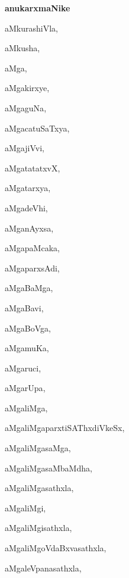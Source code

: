 \begin{center}
{\huge\bfseries anukarxmaNike}
\end{center}

\medskip

\begin{multicols}{2}

{aMkurashiVla}, \pageref{aMkurashiVla}

{aMkusha}, \pageref{aMkusha}

{aMga}, \pageref{aMga}

{aMgakirxye}, \pageref{aMgakirxye}

{aMgaguNa}, \pageref{aMgaguNa}

{aMgacatuSaTxya}, \pageref{aMgacatuSaTxya}

{aMgajiVvi}, \pageref{aMgajiVvi}

{aMgatatatxvX}, \pageref{aMgatatatxvX}

{aMgatarxya}, \pageref{aMgatarxya}

{aMgadeVhi}, \pageref{aMgadeVhi}

{aMganAyxsa}, \pageref{aMganAyxsa}

{aMgapaMcaka}, \pageref{aMgapaMcaka}

{aMgaparxsAdi}, \pageref{aMgaparxsAdi}

{aMgaBaMga}, \pageref{aMgaBaMga}

{aMgaBavi}, \pageref{aMgaBavi}

{aMgaBoVga}, \pageref{aMgaBoVga}

{aMgamuKa}, \pageref{aMgamuKa}

{aMgaruci}, \pageref{aMgaruci}

{aMgarUpa}, \pageref{aMgarUpa}

{aMgaliMga}, \pageref{aMgaliMga}

{aMgaliMgaparxtiSAThxdiVkeSx}, \pageref{aMgaliMgaparxtiSAThxdiVkeSx}

{aMgaliMgasaMga}, \pageref{aMgaliMgasaMga}

{aMgaliMgasaMbaMdha}, \pageref{aMgaliMgasaMbaMdha}

{aMgaliMgasathxla}, \pageref{aMgaliMgasathxla}

{aMgaliMgi}, \pageref{aMgaliMgi}

{aMgaliMgisathxla}, \pageref{aMgaliMgisathxla}

{aMgaliMgoVdaBxvasathxla}, \pageref{aMgaliMgoVdaBxvasathxla}

{aMgaleVpanasathxla}, \pageref{aMgaleVpanasathxla}


\end{multicols}
